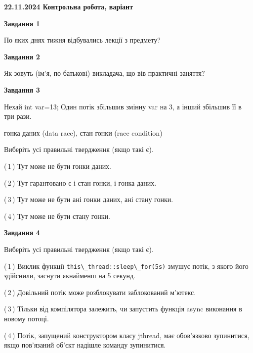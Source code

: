 \documentclass[12pt, ukrainian]{article}
\def\code#1{\Verb!#1!}
\begin{document}
\begin {large}

\textbf{22.11.2024 Контрольна робота, варіант  }\par


{

\begin{center}
\textbf{Завдання 1}
\end{center}

По яких днях тижня відбувались лекції з предмету?


\begin{center}
\textbf{Завдання 2}
\end{center}

Як зовуть (ім'я, по батькові) викладача, що вів практичні заняття?


\begin{center}
\textbf{Завдання 3}
\end{center}

Нехай int var=13; Один потік збільшив змінну var на 3, а інший збільшив її в три рази.

гонка даних (data race), стан гонки (race condition)

Виберіть усі правильні твердження (якщо такі є).\par
\vspace{2mm}
(\,1\,) Тут може не бути гонки даних.%

(\,2\,) Тут гарантовано є і стан гонки, і гонка даних.%

(\,3\,) Тут може не бути ані гонки даних, ані стану гонки.%

(\,4\,) Тут може не бути стану гонки.%


\begin{center}
\textbf{Завдання 4}
\end{center}

Виберіть усі правильні твердження (якщо такі є).\par
\vspace{2mm}

(\,1\,) Виклик функції \code{this\_thread::sleep\_for(5s)} змушує потік, з якого його здійснили, заснути якнайменш на 5 секунд.%

(\,2\,) Довільний потік може розблокувати заблокований м’ютекс.%

(\,3\,) Тільки від компілятора залежить, чи запустить функція async виконання в новому потоці.%

(\,4\,) Потік, запущений конструктором класу jthread, має обов’язково зупинитися, якщо пов’язаний об’єкт надішле команду зупинитися.%


}
\end{large}
\end{document}
